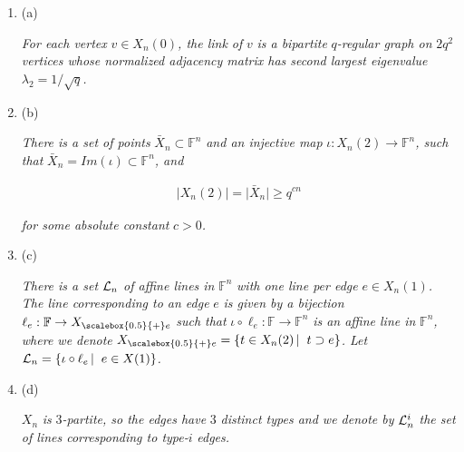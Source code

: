 \begin{enumerate}


\item[] 
(a) 


\emph{For each vertex }$v\in X_{n}(0)$\emph{, the link of }$v$\emph{ is a bipartite }$q$\emph{-regular graph on }$2q^{2}$\emph{ vertices whose normalized adjacency matrix has second largest eigenvalue }$\lambda_{2}=1/\sqrt{q}$\emph{.}\par





\item[] 
(b) 


\emph{There is a set of points }$\bar{X}_{n}\subset\mathbb{F}^{n}$\emph{ and an injective map }$\iota:X_{n}(2)\to\mathbb{F}^{n}$\emph{, such that }$\bar{X}_{n}=Im(\iota)\subset\mathbb{F}^{n}$\emph{, and}\par


\[\begin{gathered}
\lvert X_{n}(2)\rvert=\lvert\bar{X}_{n}\rvert\geq q^{cn}
\end{gathered}\]


\emph{for some absolute constant }$c>0$\emph{.}\par





\item[] 
(c) 


\emph{There is a set }${\cal L}_{n}$\emph{ of affine lines in }$\mathbb{F}^{n}$\emph{ with one line per edge }$e\in X_{n}(1)$\emph{. The line corresponding to an edge }$e$\emph{ is given by a bijection }$\ell_{e}:\mathbb{F}\to{X}_{\scalebox{0.5}{+}e}$\emph{ such that }$\iota\circ\ell_{e}:\mathbb{F}\to\mathbb{F}^{n}$\emph{ is an affine line in }$\mathbb{F}^{n}$\emph{, where we denote }${X}_{\scalebox{0.5}{+}e}=\left\{t\in X_{n}(2)\left|\;\vphantom{t\in X_{n}(2)t\supset e}\right.t\supset e\right\}$\emph{. Let }${\cal L}_{n}=\left\{\iota\circ\ell_{e}\left|\;\vphantom{\iota\circ\ell_{e}e\in
X(1)}\right.e\in X(1)\right\}$\emph{.}\par





\item[] 
(d) 


$X_{n}$\emph{ is }$3$\emph{-partite, so the edges have }$3$\emph{ distinct types and we denote by }${\cal L}^{i}_{n}$\emph{ the set of lines corresponding to type-}$i$\emph{ edges.}\par





\end{enumerate}


